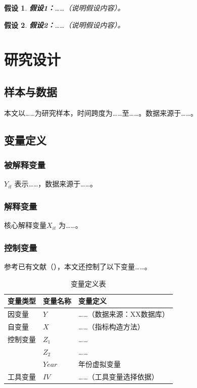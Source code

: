 \documentclass[10.5pt, UTF8, twocolumn, landscape]{ctexart}
\newcommand{\wuhao}{\fontsize{9pt}{13pt}\selectfont}
\newtheorem{hypothesis}{假设}
\begin{document}
\begin{hypothesis}
\label{hyp:h1}
\textbf{假设1：}……（说明假设内容）。
\end{hypothesis}

\begin{hypothesis}
\label{hyp:h2}
\textbf{假设2：}……（说明假设内容）。
\end{hypothesis}

\section{研究设计}
\label{sec:design}

\subsection{样本与数据}
本文以……为研究样本，时间跨度为……至……。数据来源于……。

\subsection{变量定义}

\subsubsection{被解释变量}
$Y_{it}$ 表示……，数据来源于……。

\subsubsection{解释变量}
核心解释变量$X_{it}$ 为……。

\subsubsection{控制变量}
参考已有文献（\cite{xxx}），本文还控制了以下变量……。

\begin{table}[htbp]
\centering
\caption{变量定义表}
\label{tab:var}
\wuhao
\begin{tabular}{p{2.2cm}p{2.5cm}p{5.5cm}}
\toprule
变量类型 & 变量名称 & 变量定义 \\
\midrule
因变量 & $Y$ & ……（数据来源：XX数据库）\\
\midrule
自变量 & $X$ & ……（指标构造方法）\\
\midrule
控制变量 & $Z_1$ & ……\\
& $Z_2$ & ……\\
& $Year$ & 年份虚拟变量\\
\midrule
工具变量 & $IV$ & ……（工具变量选择依据）\\
\bottomrule
\end{tabular}
\end{table}
\end{document}
